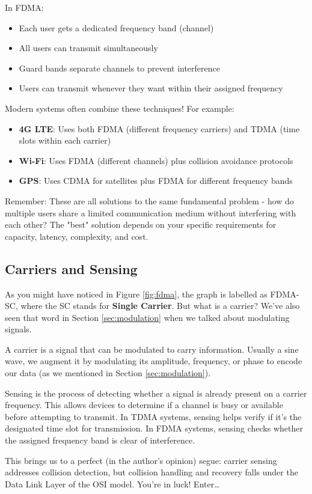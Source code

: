 In FDMA:
\begin{itemize}
    \item Each user gets a dedicated frequency band (channel)
    \item All users can transmit simultaneously
    \item Guard bands separate channels to prevent interference
    \item Users can transmit whenever they want within their assigned frequency
\end{itemize}

Modern systems often combine these techniques! For example:
\begin{itemize}
    \item \textbf{4G LTE}: Uses both FDMA (different frequency carriers) and TDMA (time slots within each carrier)
    \item \textbf{Wi-Fi}: Uses FDMA (different channels) plus collision avoidance protocols
    \item \textbf{GPS}: Uses CDMA for satellites plus FDMA for different frequency bands
\end{itemize}

\begin{importantblock}
    Remember: These are all solutions to the same fundamental problem - how do multiple users share a limited communication medium without interfering with each other? The "best" solution depends on your specific requirements for capacity, latency, complexity, and cost.
\end{importantblock}

\subsection{Carriers and Sensing}
\label{subsec:carriers_sensing}
As you might have noticed in Figure \ref{fig:fdma}, the graph is labelled as FDMA-SC, where the SC stands for \textbf{Single Carrier}. But what is a carrier? We've also seen that word in Section \ref{sec:modulation} when we talked about modulating signals.

\begin{importantblock}
    A carrier is a signal that can be modulated to carry information. Usually a sine wave, we augment it by modulating its amplitude, frequency, or phase to encode our data (as we mentioned in Section \ref{sec:modulation}).
\end{importantblock}

Sensing is the process of detecting whether a signal is already present on a carrier frequency. This allows devices to determine if a channel is busy or available before attempting to transmit. In TDMA systems, sensing helps verify if it's the designated time slot for transmission. In FDMA systems, sensing checks whether the assigned frequency band is clear of interference.

This brings us to a perfect (in the author's opinion) segue: carrier sensing addresses collision detection, but collision handling and recovery falls under the Data Link Layer of the OSI model. You're in luck! Enter\dots
